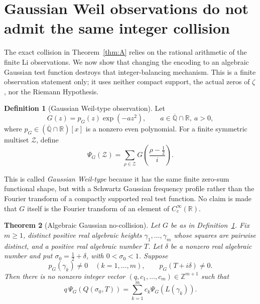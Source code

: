 \documentclass[12pt]{amsart}
\theoremstyle{definition}
\newtheorem{definition}{Definition}[section]
\theoremstyle{remark}
\theoremstyle{plain}
\newtheorem{theorem}[definition]{Theorem}
\newcommand{\RR}{\mathbb{R}}
\newcommand{\QQ}{\mathbb{Q}}
\newcommand{\ZZ}{\mathbb{Z}}
\begin{document}
\section{Gaussian Weil observations do not admit the same integer collision}
\label{sec:gaussian}

The exact collision in Theorem~\ref{thm:A} relies on the rational arithmetic
of the finite Li observations.  We now show that changing the encoding to an
algebraic Gaussian test function destroys that integer-balancing mechanism.
This is a finite observation statement only; it uses neither compact support,
the actual zeros of $\zeta$, nor the Riemann Hypothesis.

\begin{definition}[Gaussian Weil-type observation]
\label{def:gaussian-observation}
Let
\[
  G(z)=p_G(z)\exp(-az^2),
  \qquad a\in\overline{\QQ}\cap\RR,\ a>0,
\]
where $p_G\in(\overline{\QQ}\cap\RR)[x]$ is a nonzero even polynomial.  For a
finite symmetric multiset $\mathcal{Z}$, define
\[
  \Psi_G(\mathcal{Z})
  =\sum_{\rho\in\mathcal{Z}}G\!\left(\frac{\rho-\tfrac12}{i}\right).
\]
\end{definition}

This is called \emph{Gaussian Weil-type} because it has the same finite
zero-sum functional shape, but with a Schwartz Gaussian frequency profile
rather than the Fourier transform of a compactly supported real test function.
No claim is made that $G$ itself is the Fourier transform of an element of
$C_c^\infty(\RR)$.

\begin{theorem}[Algebraic Gaussian no-collision]
\label{thm:gaussian-no-collision}
Let $G$ be as in Definition~\ref{def:gaussian-observation}.
Fix $m\geq 1$, distinct positive real algebraic heights
$\gamma_1,\ldots,\gamma_m$ whose squares are pairwise distinct, and a positive
real algebraic number $T$.  Let $\delta$ be a nonzero real algebraic number
and put $\sigma_0=\tfrac12+\delta$, with $0<\sigma_0<1$.  Suppose
\[
  p_G(\gamma_k)\neq 0\quad(k=1,\ldots,m),
  \qquad
  p_G(T+i\delta)\neq 0.
\]
Then there is no nonzero integer vector
$(q,c_1,\ldots,c_m)\in\ZZ^{m+1}$ such that
\[
  q\,\Psi_G(Q(\sigma_0,T))
  =\sum_{k=1}^mc_k\Psi_G(L(\gamma_k)).
  \label{eq:gaussian-collision}
\]
\end{theorem}
\end{document}

